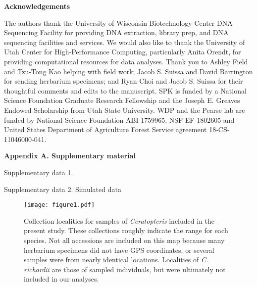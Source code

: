 \documentclass[12pt]{article}
\begin{document}
\begin{flushleft}
\vspace{1cm}

{\large\textbf{Acknowledgements}}

The authors thank the University of Wisconsin Biotechnology Center DNA Sequencing Facility for providing DNA extraction, library prep, and DNA sequencing facilities and services. We would also like to thank the University of Utah Center for High-Performance Computing, particularly Anita Orendt, for providing computational resources for data analyses. Thank you to Ashley Field and Tzu-Tong Kao helping with field work; Jacob S. Suissa and David Barrington for sending herbarium specimens; and Ryan Choi and Jacob S. Suissa for their thoughtful comments and edits to the manuscript. SPK is funded by a National Science Foundation Graduate Research Fellowship and the Joseph E. Greaves Endowed Scholarship from Utah State University. WDP and the Pearse lab are funded by National Science Foundation ABI‐1759965, NSF EF‐1802605 and United States Department of Agriculture Forest Service agreement 18‐CS‐11046000‐041.

\vspace{1cm}

{\large\textbf{Appendix A. Supplementary material}}

Supplementary data 1.

Supplementary data 2: Simulated data

\end{flushleft}
\vspace{30cm}

\begin{figure}[H]
\centering
\texttt{[image: figure1.pdf]}
\caption{Collection localities for samples of \textit{Ceratopteris} included in the present study. These collections roughly indicate the range for each species. Not all accessions are included on this map because many herbarium specimens did not have GPS coordinates, or several samples were from nearly identical locations. Localities of \textit{C. richardii} are those of sampled individuals, but were ultimately not included in our analyses.}
\label{map}
\end{figure}
\end{document}
